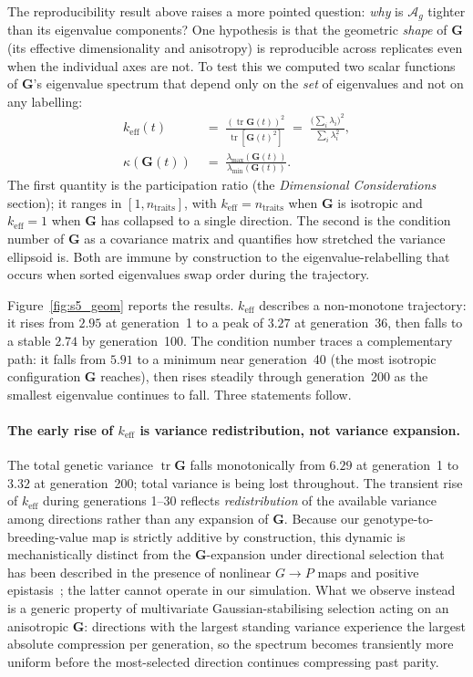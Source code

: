 \documentclass[9pt,twocolumn,twoside,lineno]{gsajnl}
\newcommand{\mat}[1]{\mathbf{#1}}
\newcommand{\tr}{\ensuremath{\operatorname{tr}}\xspace}
\newcommand{\Ag}{\ensuremath{\mathcal{A}_{g}}\xspace}
\newcommand{\keff}{\ensuremath{k_{\mathrm{eff}}}\xspace}
\begin{document}
The reproducibility result above raises a more pointed question: \emph{why} is \Ag tighter than its eigenvalue components? One hypothesis is that the geometric \emph{shape} of $\mat{G}$ (its effective dimensionality and anisotropy) is reproducible across replicates even when the individual axes are not. To test this we computed two scalar functions of $\mat{G}$'s eigenvalue spectrum that depend only on the \emph{set} of eigenvalues and not on any labelling:
\begin{align}
\keff(t) &\;=\; \frac{(\tr\mat{G}(t))^2}{\tr[\mat{G}(t)^2]} \;=\; \frac{\bigl(\sum_i \lambda_i\bigr)^2}{\sum_i \lambda_i^2}, 
\label{eq:s5_keff} \\[2pt]
\kappa(\mat{G}(t)) &\;=\; \frac{\lambda_{\max}(\mat{G}(t))}{\lambda_{\min}(\mat{G}(t))}. 
\label{eq:s5_cond}
\end{align}
The first quantity is the participation ratio (the \textit{Dimensional Considerations} section); it ranges in $[1, n_{\text{traits}}]$, with $\keff = n_{\text{traits}}$ when $\mat{G}$ is isotropic and $\keff = 1$ when $\mat{G}$ has collapsed to a single direction. The second is the condition number of $\mat{G}$ as a covariance matrix and quantifies how stretched the variance ellipsoid is. Both are immune by construction to the eigenvalue-relabelling that occurs when sorted eigenvalues swap order during the trajectory.

Figure~\ref{fig:s5_geom} reports the results. \keff describes a non-monotone trajectory: it rises from $2.95$ at generation~1 to a peak of $3.27$ at generation~36, then falls to a stable $2.74$ by generation~100. The condition number traces a complementary path: it falls from $5.91$ to a minimum near generation~40 (the most isotropic configuration $\mat{G}$ reaches), then rises steadily through generation~200 as the smallest eigenvalue continues to fall. Three statements follow.

\paragraph{The early rise of \keff is variance redistribution, not variance expansion.} 
The total genetic variance $\tr\mat{G}$ falls monotonically from $6.29$ at generation~1 to $3.32$ at generation~200; total variance is being lost throughout. The transient rise of \keff during generations 1--30 reflects \emph{redistribution} of the available variance among directions rather than any expansion of $\mat{G}$. Because our genotype-to-breeding-value map is strictly additive by construction, this dynamic is mechanistically distinct from the $\mat{G}$-expansion under directional selection that has been described in the presence of nonlinear $G\!\to\!P$ maps and positive epistasis~\citep{CarterHermissonHansen2005}; the latter cannot operate in our simulation. What we observe instead is a generic property of multivariate Gaussian-stabilising selection acting on an anisotropic $\mat{G}$: directions with the largest standing variance experience the largest absolute compression per generation, so the spectrum becomes transiently more uniform before the most-selected direction continues compressing past parity.
\end{document}
